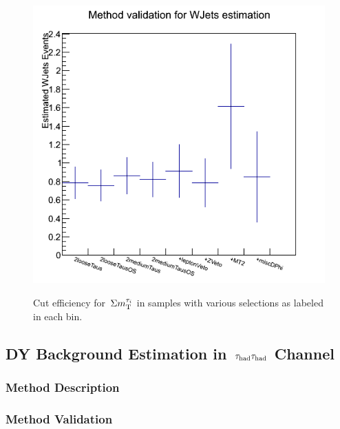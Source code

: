 \begin{figure}[htbp]
\includegraphics[angle=0,scale=0.35]{TauTauFigs/WJetsEst_bin2_BJetVetoApplied.png} \\
\caption{Cut efficiency for %
$\,\Sigma m_{\rm T}^{\tau_i}$ %
in samples with various selections as labeled in each bin.}
\label{fig:justification_bin2}
\end{figure}
\subsection{\texorpdfstring{DY Background Estimation in $\,\tau_{\rm had}\tau_{\rm had}$ Channel}{DY Background Estimation in tau-tau Channel}}
\subsubsection{Method Description}
\subsubsection{Method Validation}
